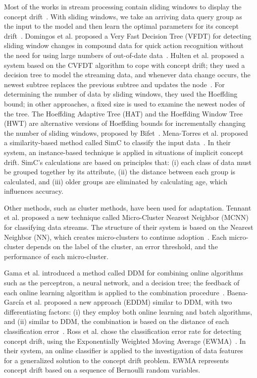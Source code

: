 \documentclass[12pt,a4paper]{article}
\begin{document}
	Most of the works in stream processing contain sliding windows to display the concept drift~\cite{Sun2017,Torquati2017}. With sliding windows, we take an arriving data query group as the input to the model and then learn the optimal parameters for its concept drift~\cite{Ross2012}. Domingos et al. proposed a Very Fast Decision Tree (VFDT) for detecting sliding window changes in compound data for quick action recognition without the need for using large numbers of out-of-date data~\cite{Domingos2000}. Hulten et al. proposed a system based on the CVFDT algorithm to cope with concept drift; they used a decision tree to model the streaming data, and whenever data change occurs, the newest subtree replaces the previous subtree and updates the node~\cite{Hulten2001}. For determining the number of data by sliding windows, they used the Hoeffding bound; in other approaches, a fixed size is used to examine the newest nodes of the tree. The Hoeffding Adaptive Tree (HAT) and the Hoeffding Window Tree (HWT) are alternative versions of Hoeffding bounds for incrementally changing the number of sliding windows, proposed by Bifet~\cite{Bifet2009}. Mena-Torres et al. proposed a similarity-based method called SimC to classify the input data~\cite{Mena2014}. In their system, an instance-based technique is applied in situations of implicit concept drift. SimC's calculations are based on principles that: (i) each class of data must be grouped together by its attribute, (ii) the distance between each group is calculated, and (iii) older groups are eliminated by calculating age, which influences accuracy.
	
	Other methods, such as cluster methods, have been used for adaptation. Tennant et al. proposed a new technique called Micro-Cluster Nearest Neighbor (MCNN) for classifying data streams. The structure of their system is based on the Nearest Neighbor (NN), which creates micro-clusters to continue adoption~\cite{Tennant2017}. Each micro-cluster depends on the label of the cluster, an error threshold, and the performance of each micro-cluster.
	
	Gama et al. introduced a method called DDM for combining online algorithms such as the perceptron, a neural network, and a decision tree; the feedback of each online learning algorithm is applied to the combination procedure~\cite{Gama2004}. Baena-Garc\'{i}a et al. proposed a new approach (EDDM) similar to DDM, with two differentiating factors: (i) they employ both online learning and batch algorithms, and (ii) similar to DDM, the combination is based on the distance of each classification error~\cite{Baena2006}. Ross et al. chose the classification error rate for detecting concept drift, using the Exponentially Weighted Moving Average (EWMA)~\cite{Ross2012}. In their system, an online classifier is applied to the investigation of data features for a generalized solution to the concept drift problem. EWMA represents concept drift based on a sequence of Bernoulli random variables.
	
\end{document}

